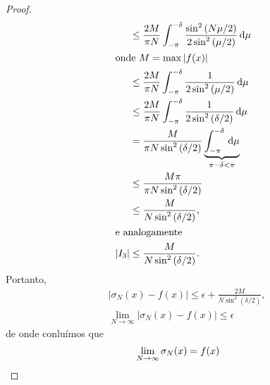 \begin{proof}
\begin{align*}
        &\leq \frac{2 M}{\pi N} \int_{-\pi}^{-\delta} \frac{\sin^2\left( N \mu/2 \right)}{2 \sin^2\left( \mu/2 \right)} \, \mathrm{d}\mu \\
        \intertext{onde $M = \max |f(x)|$}
        &\leq \frac{2 M}{\pi N} \int_{-\pi}^{-\delta} \frac{1}{2 \sin^2\left( \mu/2 \right)} \, \mathrm{d}\mu \\
        &\leq \frac{2 M}{\pi N} \int_{-\pi}^{-\delta} \frac{1}{2 \sin^2\left( \delta/2 \right)} \, \mathrm{d}\mu\\
        &= \frac{M}{\pi N \sin^2\left( \delta/2 \right)} \underbrace{\int_{-\pi}^{-\delta} \, \mathrm{d}\mu}_{\pi - \delta < \pi} \\
        &\leq \frac{M \pi}{\pi N \sin^2\left( \delta/2 \right)} \\
        &\leq \frac{M}{N \sin^2\left( \delta/2 \right)}, \\
        \intertext{e analogamente}
        |I_3| &\leq \frac{M}{N \sin^2\left( \delta/2 \right)}.
    \end{align*}
    Portanto,
    \begin{align*}
        & |\sigma_N(x) - f(x)| \leq \epsilon + \frac{2 M}{N \sin^2\left( \delta/2 \right)}, \\
        & \lim_{N \to \infty} | \sigma_N(x) - f(x) | \leq \epsilon
    \end{align*}
    de onde conlu\'{i}mos que
    \begin{align*}
        \lim_{N \to \infty} \sigma_N(x) &= f(x) \qedhere
    \end{align*}
\end{proof}

